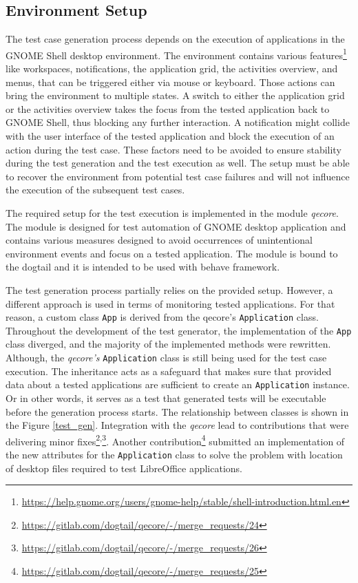 \subsection{Environment Setup}
The test case generation process depends on the execution of applications in the GNOME Shell desktop environment. The environment contains various features\footnote{\url{https://help.gnome.org/users/gnome-help/stable/shell-introduction.html.en}} like workspaces, notifications, the application grid, the activities overview, and menus, that can be triggered either via mouse or keyboard. Those actions can bring the environment to multiple states. A switch to either the application grid or the activities overview takes the focus from the tested application back to GNOME Shell, thus blocking any further interaction. A notification might collide with the user interface of the tested application and block the execution of an action during the test case. These factors need to be avoided to ensure stability during the test generation and the test execution as well. The setup must be able to recover the environment from potential test case failures and will not influence the execution of the subsequent test cases. 

The required setup for the test execution is implemented in the module \textit{qecore}. The module is designed for test automation of GNOME desktop application and contains various measures designed to avoid occurrences of unintentional environment events and focus on a tested application. The module is bound to the dogtail and it is intended to be used with behave framework.\cite{qecore} 

The test generation process partially relies on the provided setup. However, a different approach is used in terms of monitoring tested applications. For that reason, a custom class \texttt{App} is derived from the qecore's \texttt{Application} class. Throughout the development of the test generator, the implementation of the \texttt{App} class diverged, and the majority of the implemented methods were rewritten. Although, the \textit{qecore's} \texttt{Application} class is still being used for the test case execution. The inheritance acts as a safeguard that makes sure that provided data about a tested applications are sufficient to create an \texttt{Application} instance. Or in other words, it serves as a test that generated tests will be executable before the generation process starts. The relationship between classes is shown in the Figure \ref{test_gen}. Integration with the \textit{qecore} lead to contributions that were delivering minor fixes\footnote{\url{https://gitlab.com/dogtail/qecore/-/merge_requests/24}}\textsuperscript{,}\footnote{\url{https://gitlab.com/dogtail/qecore/-/merge_requests/26}}. Another contribution\footnote{\url{https://gitlab.com/dogtail/qecore/-/merge_requests/25}} submitted an implementation of the new attributes for the \texttt{Application} class to solve the problem with location of desktop files required to test LibreOffice applications.

